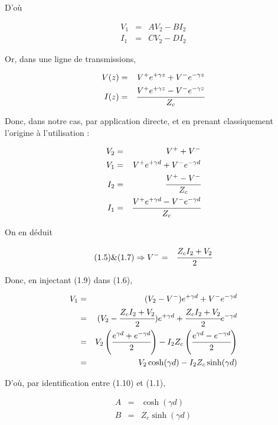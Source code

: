 \documentclass[11pt;a4paper;fleqn]{report}
\begin{document}
\begin{itemize}
     D'où

     \begin{eqnarray}
      V_1 &=& A V_2 - B I_2 \\
      I_1 &=& C V_2 - D I_2
     \end{eqnarray}

     Or, dans une ligne de transmissions, 

     \begin{eqnarray}
      V(z) &=& V^+ e^{+\gamma z} +V^- e^{-\gamma z} \\
      I(z) &=& \cfrac{V^+ e^{+\gamma z} -V^- e^{-\gamma z}}{Z_c}
     \end{eqnarray}

     Donc, dans notre cas, par application directe, et en prenant classiquement l'origine à l'utilisation :

     \begin{eqnarray}
      V_2 &=& V^+ + V^- \\
      V_1 &=& V^+ e^{+\gamma d} +V^- e^{-\gamma d} \\
      I_2 &=& \cfrac{V^+ -V^- }{Z_c}\\
      I_1 &=& \cfrac{V^+ e^{+\gamma d} -V^- e^{-\gamma d}}{Z_c}
     \end{eqnarray}

     On en déduit

     \begin{eqnarray}
      (1.5) \& (1.7) \Rightarrow V^- &=& \cfrac{Z_c I_2 + V_2}{2}
     \end{eqnarray}

     Donc, en injectant (1.9) dans (1.6), 

     \begin{eqnarray}
      V_1 &=& (V_2 - V^-) e^{+\gamma d} + V^- e^{-\gamma d} \nonumber \\
      &=& (V_2 - \cfrac{Z_c I_2 + V_2}{2}) e^{+\gamma d} + \cfrac{Z_c I_2 + V_2}{2} e^{-\gamma d} \nonumber \\
      &=& V_2 \left(\cfrac{e^{\gamma d} + e^{-\gamma d}}{2}\right) - I_2 Z_c \left(\cfrac{e^{\gamma d} - e^{-\gamma d}}{2}\right) \nonumber \\
      &=& V_2 \cosh(\gamma d) - I_2 Z_c \sinh(\gamma d)
     \end{eqnarray}

     D'où, par identification entre (1.10) et (1.1),

     \begin{eqnarray}
      A &=& \cosh(\gamma d) \\
      B &=& Z_c \sinh(\gamma d)
     \end{eqnarray}
      

\end{itemize}
\end{document}
